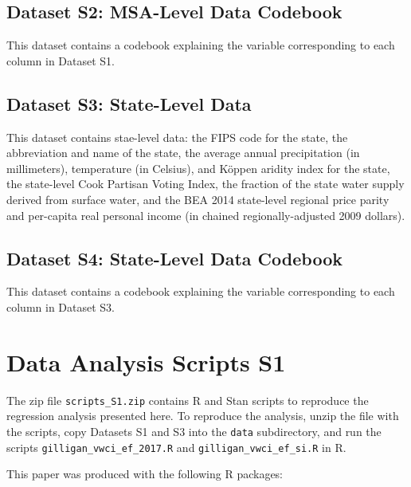 \documentclass[draft]{agujournal}
\begin{document}
\subsection*{Dataset S2: MSA-Level Data Codebook}

This dataset contains a codebook explaining the variable corresponding to each column in Dataset S1.

\subsection*{Dataset S3: State-Level Data}

This dataset contains stae-level data: the FIPS code for the state, the abbreviation and name of the state,
the average annual precipitation (in millimeters), temperature (in Celsius), and K\"oppen aridity index for the state,
the state-level Cook Partisan Voting Index,
the fraction of the state water supply derived from surface water,
and the BEA 2014 state-level regional price parity and per-capita real personal income (in chained regionally-adjusted 2009 dollars).

\subsection*{Dataset S4: State-Level Data Codebook}

This dataset contains a codebook explaining the variable corresponding to each column in Dataset S3.

\section*{Data Analysis Scripts S1}

The zip file \verb+scripts_S1.zip+ contains R and Stan scripts to reproduce the
regression analysis presented here.
To reproduce the analysis, unzip the file with the scripts, copy Datasets S1
and S3 into the \verb+data+ subdirectory, and run the scripts
\verb+gilligan_vwci_ef_2017.R+ and \verb+gilligan_vwci_ef_si.R+ in R.

This paper was produced with the following R packages:
\end{document}
